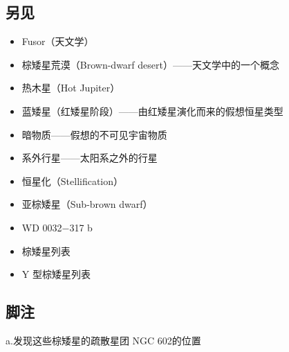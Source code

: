 \subsection{另见}
\begin{itemize}
\item Fusor（天文学）
\item 棕矮星荒漠（Brown-dwarf desert）——天文学中的一个概念
\item 热木星（Hot Jupiter）
\item 蓝矮星（红矮星阶段）——由红矮星演化而来的假想恒星类型
\item 暗物质——假想的不可见宇宙物质
\item 系外行星——太阳系之外的行星
\item 恒星化（Stellification）
\item 亚棕矮星（Sub-brown dwarf）
\item WD 0032−317 b
\item 棕矮星列表
\item Y 型棕矮星列表
\end{itemize}
\subsection{脚注}
a.发现这些棕矮星的疏散星团 NGC 602的位置
